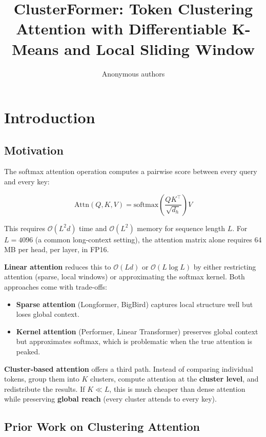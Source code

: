 \title{\textbf{ClusterFormer: Token Clustering Attention with Differentiable K-Means and Local Sliding Window}}

\author{Anonymous authors}


\section{Introduction}

\subsection{Motivation}

The softmax attention operation computes a pairwise score between every 
query and every key:

\[
\text{Attn}(Q, K, V) = \text{softmax}\!\left(\frac{Q K^\top}{\sqrt{d_h}}\right) V
\]

This requires $\mathcal{O}(L^2 d)$ time and $\mathcal{O}(L^2)$ memory for 
sequence length $L$. For $L = 4096$ (a common long-context setting), the 
attention matrix alone requires 64 MB per head, per layer, in FP16.

\textbf{Linear attention} reduces this to $\mathcal{O}(L d)$ or 
$\mathcal{O}(L \log L)$ by either restricting attention (sparse, local 
windows) or approximating the softmax kernel. Both approaches come with 
trade-offs:

\begin{itemize}
\item \textbf{Sparse attention} (Longformer, BigBird) captures local structure well
  but loses global context.
\item \textbf{Kernel attention} (Performer, Linear Transformer) preserves global
  context but approximates softmax, which is problematic when the true
  attention is peaked.

\end{itemize}
\textbf{Cluster-based attention} offers a third path. Instead of comparing 
individual tokens, group them into $K$ clusters, compute attention at the 
\textbf{cluster level}, and redistribute the results. If $K \ll L$, this is much 
cheaper than dense attention while preserving \textbf{global reach} (every 
cluster attends to every key).

\subsection{Prior Work on Clustering Attention}

